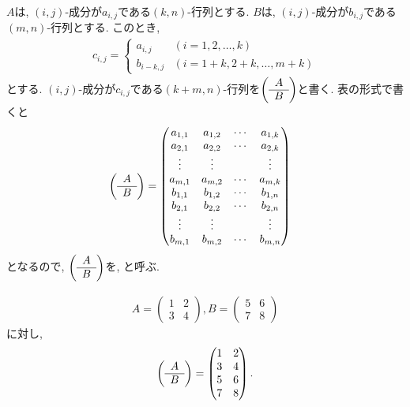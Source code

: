 \begin{definition}
  $A$は, $(i,j)$-成分が$a_{i,j}$である$(k,n)$-行列とする.
  $B$は, $(i,j)$-成分が$b_{i,j}$である$(m,n)$-行列とする.  
  このとき,
  \begin{align*}
    c_{i,j}=
    \begin{cases}
      a_{i,j} &(i=1,2,\ldots,k)\\
      b_{i-k,j}&(i=1+k,2+k,\ldots,m+k)
    \end{cases}
  \end{align*}
  とする.
  $(i,j)$-成分が$c_{i,j}$である$(k+m,n)$-行列を$\left(\begin{array}{c}A\\\hline B\end{array}\right)$と書く.
  表の形式で書くと
  \begin{align*}
    \left(\begin{array}{c}A\\\hline B\end{array}\right)
    &=
    \begin{pmatrix}
      a_{1,1}&a_{1,2}&\cdots&a_{1,k}\\
      a_{2,1}&a_{2,2}&\cdots&a_{2,k}\\
      \vdots&\vdots&&\vdots\\
      a_{m,1}&a_{m,2}&\cdots&a_{m,k}\\
      b_{1,1}&b_{1,2}&\cdots&b_{1,n}\\
      b_{2,1}&b_{2,2}&\cdots&b_{2,n}\\
      \vdots&\vdots&&\vdots\\
      b_{m,1}&b_{m,2}&\cdots&b_{m,n}
    \end{pmatrix}
  \end{align*}
  となるので,
  $\left(\begin{array}{c}A\\\hline B\end{array}\right)$を,
  と呼ぶ. 
\end{definition}


\begin{example}
  \begin{align*}
    A=\begin{pmatrix}1&2\\3&4\end{pmatrix},
    B=\begin{pmatrix}5&6\\7&8\end{pmatrix}
  \end{align*}
  に対し,
  \begin{align*}
    \left(\begin{array}{c}A\\\hline B\end{array}\right)=
    \begin{pmatrix}1&2\\3&4\\5&6\\7&8
\end{pmatrix}.
  \end{align*}
\end{example}


